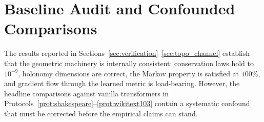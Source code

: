 \documentclass[11pt,a4paper]{article}
\theoremstyle{definition}
\theoremstyle{remark}
\begin{document}
\section{Baseline Audit and Confounded Comparisons}%
\label{sec:baseline_audit}

The results reported in Sections~\ref{sec:verification}--\ref{sec:topo_channel} 
establish that the geometric machinery is internally consistent: 
conservation laws hold to $10^{-9}$, holonomy dimensions are 
correct, the Markov property is satisfied at $100\%$, and gradient 
flow through the learned metric is load-bearing. However, the 
headline comparisons against vanilla transformers in 
Protocols~\ref{prot:shakespeare}--\ref{prot:wikitext103} contain 
a systematic confound that must be corrected before the empirical 
claims can stand.
\end{document}
